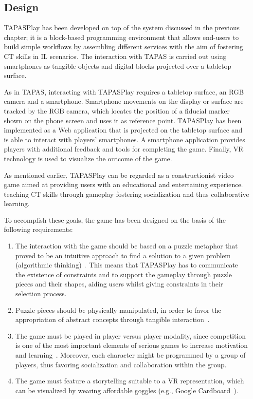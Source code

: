 \subsection{Design}
TAPASPlay has been developed on top of the  system discussed in the previous chapter; it is a block-based programming environment that allows end-users to build simple workflows by assembling different services with the aim of fostering \ac{CT} skills in \ac{IL} scenarios. The interaction with \ac{TAPAS} is carried out using smartphones as tangible objects and digital blocks projected over a tabletop surface.

As in \ac{TAPAS}, interacting with TAPASPlay requires a tabletop surface, an RGB camera and a smartphone. Smartphone movements on the display or surface are tracked by the RGB camera, which locates the position of a fiducial marker shown on the phone screen and uses it as reference point. TAPASPlay has been implemented as a Web application that is projected on the tabletop surface and is able to interact with players' smartphones. A smartphone application provides players with additional feedback and tools for completing the game. Finally, \ac{VR} technology is used to visualize the outcome of the game.

As mentioned earlier, TAPASPlay can be regarded as a constructionist video game aimed at providing users with an educational and entertaining experience.  teaching \ac{CT} skills through gameplay fostering socialization and thus collaborative learning.

To accomplish these goals, the game has been designed on the basis of the following requirements:
\begin{enumerate}
\item The interaction with the game should be based on a puzzle metaphor that proved to be an intuitive approach to find a solution to a given problem (algorithmic thinking)~\cite{turchi2017tapas}. This means that TAPASPlay has to communicate the existence of constraints and to support the gameplay through puzzle pieces and their shapes, aiding users whilst giving constraints in their selection process.
\item Puzzle pieces should be physically manipulated, in order to favor the appropriation of abstract concepts through tangible interaction~\cite{Wang:2014jy}.
\item The game must be played in player versus player modality, since competition is one of the most important elements of serious games to increase motivation and learning~\cite{Cagiltay:2015}. Moreover, each character might be programmed by a group of players, thus favoring socialization and collaboration within the group. 
\item The game must feature a storytelling suitable to a \ac{VR} representation, which can be visualized by wearing affordable goggles (e.g., Google Cardboard~\cite{CARDBOARD}).
\end{enumerate}


